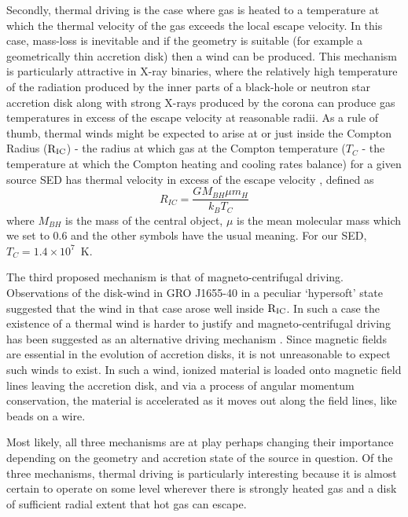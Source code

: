 \documentclass[a4paper,fleqn,usenatbib]{mnras}
\begin{document}
Secondly, thermal driving is the case where gas is heated to a temperature at which the thermal velocity of the 
gas exceeds
the local escape velocity. In this case, mass-loss is inevitable and if the geometry is suitable (for example a
geometrically thin accretion disk) then a wind can be produced. This mechanism is particularly attractive in 
X-ray binaries, where the relatively high temperature of the radiation produced by the inner parts of a black-hole or 
neutron star accretion disk along with strong X-rays produced by the corona can produce gas temperatures in excess
of the escape velocity at reasonable radii. As a rule of thumb, thermal winds might be expected
to arise at or just inside the Compton Radius ($\rm{R_{IC}}$) - the radius at which gas at the Compton temperature ($T_C$ - 
the temperature at which the Compton heating and cooling rates balance)
for a given source SED has thermal velocity in excess of the escape velocity \citep{1983ApJ...271...70B}, defined as
\begin{equation}
R_{IC}=\frac{GM_{BH}\mu m_H}{k_BT_C}
\end{equation}
where $M_{BH}$ is the mass of the central object, $\mu$ is the 
mean molecular mass which we set to 0.6 and the other symbols have the usual meaning. 
For our SED, $T_C=1.4\times10^7$~K.


 The third proposed mechanism is that of magneto-centrifugal driving. 
Observations of the disk-wind in GRO J1655-40 in a peculiar `hypersoft' state suggested that the wind in that
case arose well inside $\rm{R_{IC}}$. In such a case the existence of a thermal wind is harder to justify 
and magneto-centrifugal driving has been suggested as an alternative driving mechanism
\citep[but also see \citealt{2006ApJ...652L.117N,2015MNRAS.451..475U,2016ApJ...823..159S}]
{1992ApJS...80..753S,2006Natur.441..953M,2008ApJ...680.1359M,2009ApJ...701..865K}. Since
magnetic fields are essential in the evolution of accretion disks, it is not unreasonable to expect such winds to 
exist. In such a wind, ionized material is loaded onto magnetic field lines leaving the accretion disk, and via a process
of angular momentum conservation, the material is accelerated as it moves out along the field lines, like beads
on a wire.

Most likely, all three mechanisms are at play perhaps changing their importance depending on the
geometry and accretion state of the source in question. Of the three mechanisms, thermal driving is 
particularly interesting because it is almost certain to 
operate on some level wherever there is strongly heated gas and a disk of sufficient radial extent that hot gas 
can escape. 
\end{document}
